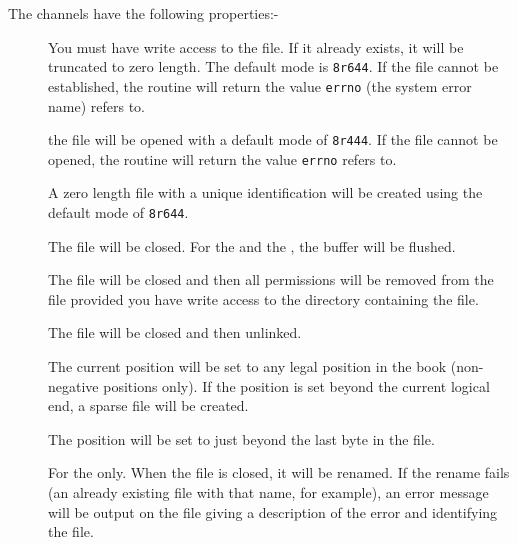 \begin{enumerate}
The channels have the following properties:-
\begin{description}
\item[] You must have write access to the file. If it already
exists, it will be truncated to zero length. The default mode is
\verb|8r644|. If the file cannot be established, the routine will return
the value \verb|errno| (the system error name) refers to.
\item[] the file will be opened with a default mode of \verb|8r444|.
If the file cannot be opened, the routine will return the value
\verb|errno| refers to.
\item[] A zero length file with a unique identification will be
created using the default mode of \verb|8r644|.
\item[] The file will be closed. For the
 and the , the
buffer will be flushed.
\item[] The file will be closed and then all permissions will be
removed from the file provided you have write access to the directory
containing the file.
\item[] The file will be closed and then unlinked.
\item[] The current position will be set to any legal position in
the book (non-negative positions only). If the position is set beyond
the current logical end, a sparse file will be created.
\item[] The position will be set to just beyond the last
byte in the file.
\item[] For the  only. When
the file is closed, it will be renamed. If the rename fails (an
already existing file with that name, for example), an error message
will be output on the  file giving a description of
the error and identifying the file.
\end{description}


\end{enumerate}
